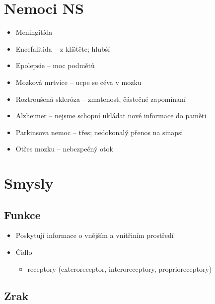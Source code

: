 \documentclass[a4]{article}
\begin{document}
\section{Nemoci NS}
\begin{itemize}
	\item Meningitída
		-- 
	\item Encefalitida
		-- z klíštěte; hlubší
	\item Epolepsie -- moc podmětů
	\item Mozková mrtvice -- ucpe se céva v mozku
	\item Roztroušená skleróza
		-- zmatenost, částečné zapomínaní
	\item Alzheimer
		-- nejsme schopní ukládat nové informace do paměti
	\item Parkinsova nemoc
		-- třes; nedokonalý přenos na sinapsi
	\item Otřes mozku
		-- nebezpečný otok

\end{itemize}


\section{Smysly}
\subsection{Funkce}
\begin{itemize}
	\item Poskytují informace o vnějším a vnitřiním prostředí
	\item Čidlo
		\begin{itemize}
			\item receptory (exteroreceptor, interoreceptory, proprioreceptory)
		\end{itemize}
\end{itemize}

\subsection{Zrak}
\end{document}
